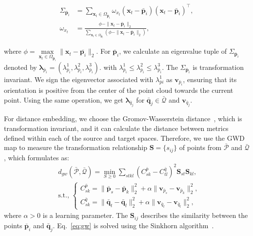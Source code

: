 \begin{equation}
    \begin{aligned}
        \Sigma_{\bar{\bm{p}}_i} &= \sum_{\bm{x}_t\in\Omega_{\bar{\bm{p}}_i}}\omega_{x_t}(\bm{x}_t-\bar{\bm{p}}_i)(\bm{x}_t-\bar{\bm{p}}_i)^\top,\\
        \omega_{x_t} & = \frac{\phi-\|\bm{x}_t-\bar{\bm{p}}_i\|_2}{\sum_{\bm{x}_t\in\Omega_{\bar{\bm{p}}_i}}(\phi-\|\bm{x}_t-\bar{\bm{p}}_i\|_2)}, 
    \end{aligned}
\end{equation}

where $\phi=\max\limits_{\bm{x}_t\in\Omega_{\bar{\bm{p}}_i}}\|\bm{x}_t-\bar{\bm{p}_i}\|_2$.
For $\bar{\bm{p}}_i$, we calculate an eigenvalue tuple of $\Sigma_{\bar{\bm{p}}_i}$ denoted by $\bm{{\lambda}}_{\bar{p}_i}=({\lambda}_{\bar{p}_i}^{1}, {\lambda}_{\bar{p}_i}^{2}, {\lambda}_{\bar{p}_i}^{3})$.
with ${\lambda}_{\bar{p}_i}^{1} \leq {\lambda}_{\bar{p}_i}^{2}\leq {\lambda}_{\bar{p}_i}^{3}$.
The $\Sigma_{\bar{\bm{p}}_i}$ is transformation invariant.
We sign the eigenvector associated with ${\lambda}_{\bar{p}i}^{1}$ as $\bm{v}_{\bar{p}_i}$, ensuring that its orientation is positive from the center of the point cloud towards the current point.
Using the same operation, we get $\bm{{\lambda}}_{\bar{q}_j}$ for $\bar{\bm{q}}_j\in\bar{\bm{\mathcal{Q}}}$ and $\bm{v}_{\bar{q}_j}$.

For distance embedding, we choose the Gromov-Wasserstein distance~\cite{peyre2019computational}, which is transformation invariant, and it can calculate the distance between metrics defined within each of the source and target spaces. 
Therefore, we use the GWD map to measure the transformation relationship $\bm{S}=\{s_{ij}\}$ of points from $\bar{\bm{\mathcal{P}}}$ and $\bar{\bm{\mathcal{Q}}}$, which formulates as:
\begin{equation}\label{eq:gw}
\begin{aligned}
&d_{gw}\left(\bar{\bm{\mathcal{P}}},\bar{\bm{\mathcal{Q}}}\right)=\min_{S\geq0}\sum_{stkl}\left(C_{sk}^{\bar{p}}-{C_{tl}^{\bar{q}}}\right)^2 \bm{S}_{st}\bm{S}_{kl},\\
&\mbox{s.t.,~} 
\begin{cases}
C_{sk}^{\bar{p}}=\|\bar{\bm{p}}_{s}-\bar{\bm{p}}_{k}\|^2_2+\alpha\|\bm{v}_{\bar{p}_s}-\bm{v}_{\bar{p}_k}\|^2_2,\\
C_{sk}^{\bar{q}}=\|\bar{\bm{q}}_{t}-\bar{\bm{q}}_{l}\|^2_2+\alpha\|\bm{v}_{\bar{q}_t}-\bm{v}_{\bar{q}_l}\|^2_2,
\end{cases}
\end{aligned}
\end{equation}
where $\alpha>0$ is a learning parameter. The $\bm{S}_{ij}$ describes the similarity between the points $\bar{\bm{p}}_i$ and $\bar{\bm{q}}_{j}$.
Eq.~\eqref{eq:gw} is solved using the Sinkhorn algorithm~\cite{peyre2019computational}.


